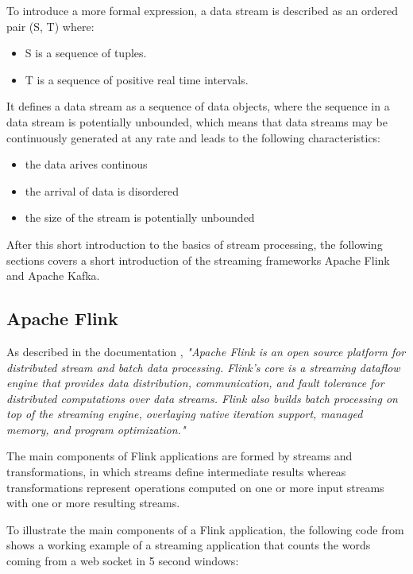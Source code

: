 To introduce a more formal expression, a data stream is described as an ordered pair (S, T) where:
\begin{itemize}
	\item S is a sequence of tuples.
	\item T is a sequence of positive real time intervals.
\end{itemize}

It defines a data stream as a sequence of data objects, where the sequence in a data stream
is potentially unbounded, which means that data streams may be continuously generated
at any rate \cite{Nam15} and leads to the following characteristics:
\begin{itemize}
	\item the data arives continous
	\item the arrival of data is disordered
	\item the size of the stream is potentially unbounded
\end{itemize}

After this short introduction to the basics of stream processing, the following sections
covers a short introduction of the streaming frameworks Apache Flink and Apache Kafka.
\subsection{Apache Flink}

As described in the documentation \cite{FlinkD16}, \textit{"Apache Flink is an open source platform for
distributed stream and batch data processing. Flink’s core is a streaming dataflow engine that
provides data distribution, communication, and fault tolerance for distributed computations over
data streams. Flink also builds batch processing on top of the streaming engine, overlaying native
iteration support, managed memory, and program optimization."}

The main components of Flink applications are formed by streams and transformations, in which
streams define intermediate results whereas transformations represent operations computed on one
or more input streams with one or more resulting streams.

To illustrate the main components of a Flink application, the following code from \cite{FlinkD16} shows
a working example of a streaming application that counts the words coming from a web socket in 5
second windows:

